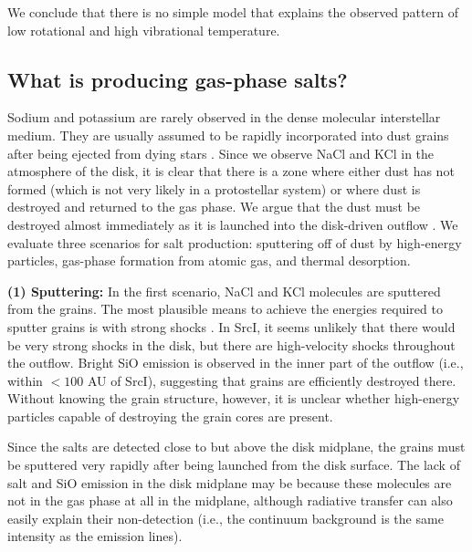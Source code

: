 \documentclass[twocolumn]{aastex62}
\newcommand{\sourcei}{SrcI\xspace}
\begin{document}
\bigskip

We conclude that there is no simple model that explains the observed pattern of
low rotational and high vibrational temperature.



\subsection{What is producing gas-phase salts?}

Sodium and potassium are rarely observed in the dense molecular interstellar
medium.  They are usually assumed to be rapidly incorporated into dust grains
after being ejected from dying stars \citep[e.g.,][]{Milam2007a}.  Since we
observe NaCl and KCl in the atmosphere of the disk, it is clear that
there is a zone where either dust has not  formed  (which is not very likely
in a protostellar system)
or
where dust is destroyed and returned to the gas phase.  We argue that the dust
must be destroyed almost immediately as it is launched into the disk-driven
outflow \citep{Hirota2017b}. We evaluate three scenarios for salt production:
sputtering off of dust by high-energy particles, gas-phase formation from
atomic gas, and thermal desorption.


\textbf{(1) Sputtering:}
In the first scenario, NaCl and KCl molecules are sputtered from the grains.
The most plausible means to achieve the energies required to sputter grains is
with strong shocks \citep{Schilke1997a,Decin2016a}.  In \sourcei, it seems
unlikely that there would be very strong shocks in the disk, but there are
high-velocity shocks throughout the outflow.  Bright SiO emission is observed in
the inner part of the outflow (i.e., within $<100$ AU of \sourcei), suggesting
that grains are efficiently destroyed there.  Without knowing the grain
structure, however, it is unclear whether high-energy particles capable of
destroying the grain cores are present.

Since the salts are detected close to but above the disk midplane, the
grains must be sputtered very rapidly after being launched from the disk surface.
The lack of salt and SiO emission in the disk midplane may be because these
molecules are not in the gas phase at all in the midplane, although radiative
transfer can also easily explain their non-detection (i.e., the continuum
background is the same intensity as the emission lines).
\end{document}
